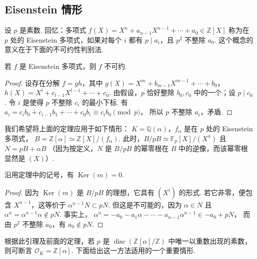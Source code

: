 \subsection{Eisenstein 情形}\label{sec:nt-2-5-6}
设 $p$ 是素数. 回忆：多项式
$f(X)=X^n+a_{n-1}X^{n-1}+\cdots+a_0\in\mathbb Z[X]$
称为在 $p$ 处的 Eisenstein 多项式，如果对每个 $i$ 都有 $p\mid a_i$，且 $p^2$ 不整除 $a_0$.
这个概念的意义在于下面的不可约性判别法.
\begin{lemma*}
若 $f$ 是 Eisenstein 多项式，则 $f$ 不可约.
\end{lemma*}
\begin{proof}
设存在分解 $f=gh$，其中
$g(X)=X^m+b_{m-1}X^{m-1}+\cdots+b_0$，
$h(X)=X^l+c_{l-1}X^{l-1}+\cdots+c_0$.
由假设，$p$ 恰好整除 $b_0,c_0$ 中的一个；设 $p\mid c_0$.
令 $i$ 是使得 $p$ 不整除 $c_i$ 的最小下标.
有 $a_i=c_ib_0+c_{i-1}b_1+\cdots+c_0b_i\equiv c_ib_0\pmod p$，
所以 $p$ 不整除 $a_i$，矛盾.
\end{proof}
我们希望将上面的定理应用于如下情形：
$K=\mathbb Q(\alpha)$，$f_\alpha$ 是在 $p$ 处的 Eisenstein 多项式，
$B=\mathbb Z[\alpha]\simeq\mathbb Z[X]/(f_\alpha)$.
此时，$B/pB\simeq\mathbb F_p[X]/(X^n)$ 且 $N=pB+\alpha B$
（因为按定义，$N$ 是 $B/pB$ 的幂零根在 $B$ 中的逆像，而该幂零根显然是 $(X)$）.
\begin{lemma*}
沿用定理中的记号，有 $\operatorname{Ker}(m)=0$.
\end{lemma*}
\begin{proof}
因为 $\operatorname{Ker}(m)$ 是 $B/pB$ 的理想，它具有 $(X^i)$ 的形式.
若它非零，便包含 $X^{n-1}$，这等价于 $\alpha^{n-1}N\subset pN$.
但这是不可能的，因为 $\alpha\in N$ 且 $\alpha^n=\alpha^{n-1}\alpha\notin pN$.
事实上，
$\alpha^n=-a_0-a_1\alpha-\cdots-a_{n-1}\alpha^{n-1}\in-a_0+pN$，
而由 $p^2$ 不整除 $a_0$，有 $a_0\notin pN$.
\end{proof}
根据此引理及前面的定理，若 $p$ 是 $\operatorname{disc}(\mathbb Z[\alpha]/\mathbb Z)$ 中唯一以重数出现的素数，则可断言 $\mathcal O_K=\mathbb Z[\alpha]$.
下面给出这一方法适用的一个重要情形.

